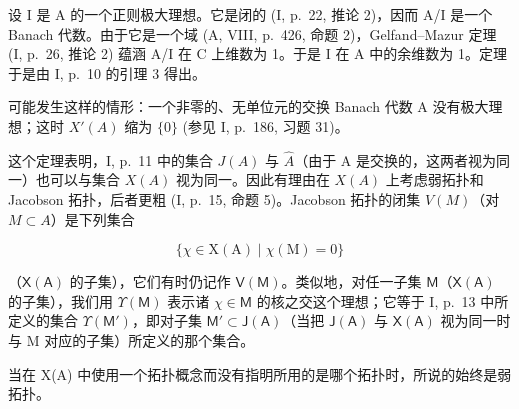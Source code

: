 设 I 是 A 的一个正则极大理想。它是闭的 (I, p.~22, 推论 2)，因而 A/I 是一个 Banach 代数。由于它是一个域 (A, VIII, p.~426, 命题 2)，Gelfand--Mazur 定理 (I, p.~26, 推论 2) 蕴涵 A/I 在 C 上维数为 1。于是 I 在 A 中的余维数为 1。定理于是由 I, p.~10 的引理 3 得出。

可能发生这样的情形：一个非零的、无单位元的交换 Banach 代数 A 没有极大理想；这时 \(X'(A)\) 缩为 \(\{0\}\) (参见 I, p.~186, 习题 31)。

这个定理表明，I, p.~11 中的集合 \(J(A)\) 与 \(\hat{A}\)（由于 A 是交换的，这两者视为同一）也可以与集合 \(X(A)\) 视为同一。因此有理由在 \(X(A)\) 上考虑弱拓扑和 Jacobson 拓扑，后者更粗 (I, p.~15, 命题 5)。Jacobson 拓扑的闭集 \(V(M)\)（对 \(M \subset A\)）是下列集合

\[
\{\chi \in \mathrm{X} (\mathrm{A}) \mid \chi (\mathrm{M}) = 0 \}
\]

（\(\mathsf{X}(\mathsf{A})\) 的子集），它们有时仍记作 \(\mathsf{V}(\mathsf{M})\)。类似地，对任一子集 \(\mathsf{M}\)（\(\mathsf{X}(\mathsf{A})\) 的子集），我们用 \(\Upsilon(\mathsf{M})\) 表示诸 \(\chi \in \mathsf{M}\) 的核之交这个理想；它等于 I, p.~13 中所定义的集合 \(\Upsilon(\mathsf{M}')\)，即对子集 \(\mathsf{M}' \subset \mathsf{J}(\mathsf{A})\)（当把 \(\mathsf{J}(\mathsf{A})\) 与 \(\mathsf{X}(\mathsf{A})\) 视为同一时与 M 对应的子集）所定义的那个集合。

当在 X(A) 中使用一个拓扑概念而没有指明所用的是哪个拓扑时，所说的始终是弱拓扑。

